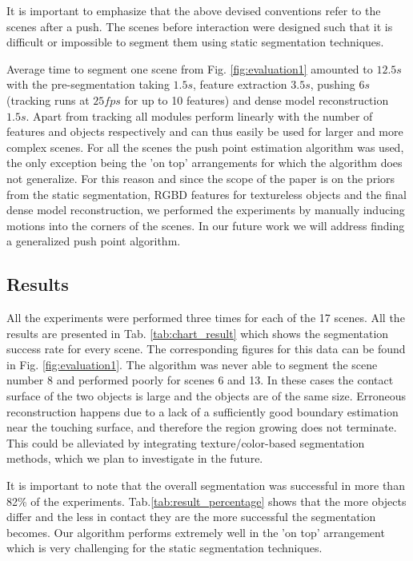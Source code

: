 It is  important to  emphasize that the above  devised conventions 
refer to  the scenes after a  push. The scenes  before interaction were
designed such that it is difficult or impossible to segment
them using static segmentation techniques.
 
Average time to segment one scene from Fig. \ref{fig:evaluation1} amounted to $12.5s$ 
with the pre-segmentation taking $1.5s$, feature extraction $3.5s$, pushing 
$6s$ (tracking runs at $25fps$ for up to 10 features) and dense model reconstruction $1.5s$.
Apart from tracking all modules perform linearly with the
number of  features and objects  respectively and can thus  easily be
used for larger and more complex  scenes. For all the scenes the push
point estimation algorithm was used, the only exception being the 'on
top'  arrangements for which the algorithm does not generalize. 
For this reason and since the scope of the paper is on the priors from
the static segmentation, RGBD features for
textureless objects and the final dense model reconstruction, we performed
the experiments by manually inducing motions into the corners of the scenes.
In  our  future work we  will address  finding a generalized  push point algorithm.
\vspace{-0.5ex}
\subsection{Results}
All  the  experiments were  performed  three  times  for each  of  the
17    scenes.    All    the    results   are    presented    in Tab.
\ref{tab:chart_result} which  shows the segmentation success rate  for every scene. 
The  corresponding figures for this data  can be found in  Fig. \ref{fig:evaluation1}. 
The algorithm was never able to segment the scene number 8 and performed poorly for scenes
6 and 13. In these cases the contact surface of the two objects is large and the objects are of the same size.
Erroneous reconstruction happens due to a lack of a sufficiently good boundary estimation
near the touching surface, and therefore the region growing does not terminate.
This could be alleviated by integrating texture/color-based segmentation methods,
which we plan to investigate in the future.

It  is  important to  note  that  the  overall
segmentation   was    successful   in   more   than    82\%   of   the
experiments.  Tab.\ref{tab:result_percentage}  shows that the more
objects differ  and the less in  contact they are  the more successful
the  segmentation becomes.  Our
algorithm  performs extremely well in the  'on top'  arrangement which  is very
challenging for the static segmentation techniques.

